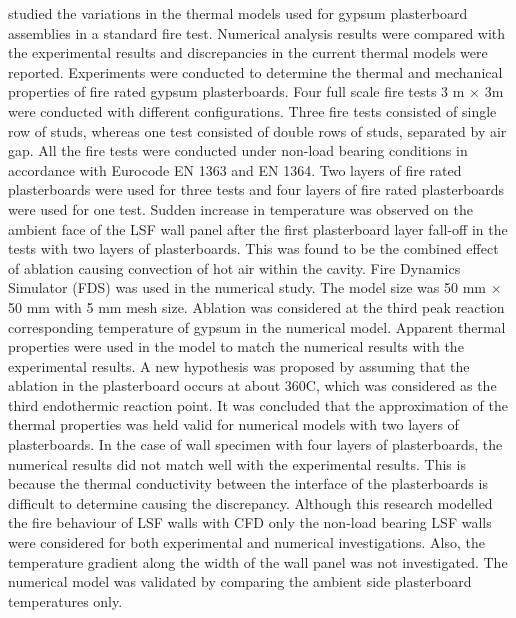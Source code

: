 \citet{Lazaro2016} studied the variations in the thermal models used for gypsum plasterboard assemblies in a standard fire test. Numerical analysis results were compared with the experimental results and discrepancies in the current thermal models were reported. Experiments were conducted to determine the thermal and mechanical properties of fire rated gypsum plasterboards. Four full scale fire tests 3 m \(\times\) 3m were conducted with different configurations. Three fire tests consisted of single row of studs, whereas one test consisted of double rows of studs, separated by air gap. All the fire tests were conducted under non-load bearing conditions in accordance with Eurocode EN 1363 and EN 1364. Two layers of fire rated plasterboards were used for three tests and four layers of fire rated plasterboards were used for one test. Sudden increase in temperature was observed on the ambient face of the LSF wall panel after the first plasterboard layer fall-off in the tests with two layers of plasterboards. This was found to be the combined effect of ablation causing convection of hot air within the cavity. Fire Dynamics Simulator (FDS) was used in the numerical study. The model size was 50 mm \(\times\) 50 mm with 5 mm mesh size. Ablation was considered at the third peak reaction corresponding temperature of gypsum in the numerical model. Apparent thermal properties were used in the model to match the numerical results with the experimental results. A new hypothesis was proposed by assuming that the ablation in the plasterboard occurs at about 360\degree C, which was considered as the third endothermic reaction point. It was concluded that the approximation of the thermal properties was held valid for numerical models with two layers of plasterboards. In the case of wall specimen with four layers of plasterboards, the numerical results did not match well with the experimental results. This is because the thermal conductivity between the interface of the plasterboards is difficult to determine causing the discrepancy. Although this research modelled the fire behaviour of LSF walls with CFD only the non-load bearing LSF walls were considered for both experimental and numerical investigations. Also, the temperature gradient along the width of the wall panel was not investigated. The numerical model was validated by comparing the ambient side plasterboard temperatures only.

